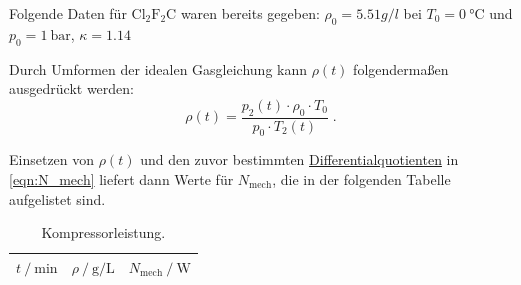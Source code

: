 Folgende Daten für $\mathrm{Cl}_2 \mathrm{F}_2 \mathrm{C}$ waren bereits gegeben:
$ρ_0 = \SI{5.51} g/l$ bei $T_0 = \SI{0}{\celsius}$ und $p_0 = \SI{1}{\bar}$, $κ = 1.14$

Durch Umformen der idealen Gasgleichung kann $\rho(t)$ folgendermaßen ausgedrückt werden:
\begin{equation*}
  \rho(t) = \frac{p_2(t) \cdot \rho_0 \cdot T_0}{p_0 \cdot T_2(t)} \; .
\end{equation*}

Einsetzen von $\rho(t)$ und den zuvor bestimmten \hyperref[tab:derivatives]{Differentialquotienten} in \autoref{eqn:N_mech} liefert dann Werte für $N_\text{mech}$,
die in der folgenden Tabelle aufgelistet sind.

\begin{table}
\centering
\caption{Kompressorleistung.}
\begin{tabular}{c c c}
\toprule
$t \mathbin{/} \si{\minute}$ &
$\rho \mathbin{/} \si{\gram\per\liter}$ &
$N_\text{mech} \mathbin{/} \si{\watt}$ \\
\midrule

\bottomrule
\end{tabular}
\end{table}
